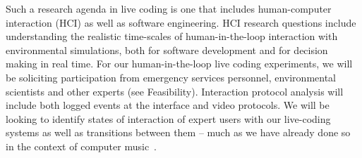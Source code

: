 Such a research agenda in live coding is one that 
includes human-computer interaction (HCI) as well as software engineering. HCI research questions include understanding the realistic time-scales of 
human-in-the-loop interaction with environmental simulations, both for software development and for decision making in real time.
For our human-in-the-loop live coding experiments, we will be soliciting participation from emergency services personnel, environmental scientists and other experts (see Feasibility).
Interaction protocol analysis will include both logged events at the interface and 
video protocols. We will be looking to identify states of interaction 
of expert users with our live-coding systems as well as transitions between them -- much as we have already done so in the 
context of computer music~\parencite{swift2014coding}.\\








